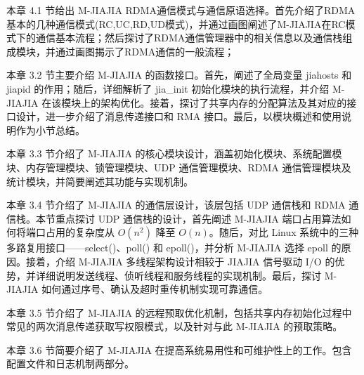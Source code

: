 {    本章 4.1 节给出 M-JIAJIA RDMA通信模式与通信原语选择。首先介绍了RDMA基本的几种通信模式(RC,UC,RD,UD模式)，并通过画图阐述了M-JIAJIA在RC模式下的通信基本流程；然后探讨了RDMA通信管理器中的相关信息以及通信栈组成模块，并通过画图揭示了RDMA通信的一般流程；

    本章 3.2 节主要介绍 M-JIAJIA 的函数接口。首先，阐述了全局变量 jiahosts 和 jiapid 的作用；随后，详细解析了 jia\_init 初始化模块的执行流程，并介绍 M-JIAJIA 在该模块上的架构优化。接着，探讨了共享内存的分配算法及其对应的接口设计，进一步介绍了消息传递接口和 RMA 接口。最后，以模块概述和使用说明作为小节总结。

    本章 3.3 节介绍了 M-JIAJIA 的核心模块设计，涵盖初始化模块、系统配置模块、内存管理模块、锁管理模块、UDP 通信管理模块、RDMA 通信管理模块及统计模块，并简要阐述其功能与实现机制。

    本章 3.4 节介绍了 M-JIAJIA 的通信层设计，该层包括 UDP 通信栈和 RDMA 通信栈。本节重点探讨 UDP 通信栈的设计，首先阐述 M-JIAJIA 端口占用算法如何将端口占用的复杂度从 $O(n^2)$ 降至 $O(n)$。随后，对比 Linux 系统中的三种多路复用接口——select()、poll() 和 epoll()，并分析 M-JIAJIA 选择 epoll 的原因。接着，介绍 M-JIAJIA 多线程架构设计相较于 JIAJIA 信号驱动 I/O 的优势，并详细说明发送线程、侦听线程和服务线程的实现机制。最后，探讨 M-JIAJIA 如何通过序号、确认及超时重传机制实现可靠通信。

    本章 3.5 节介绍了 M-JIAJIA 的远程预取优化机制，包括共享内存初始化过程中常见的两次消息传递获取写权限模式，以及针对与此 M-JIAJIA 的预取策略。

    本章 3.6 节简要介绍了 M-JIAJIA 在提高系统易用性和可维护性上的工作。包含配置文件和日志机制两部分。
}